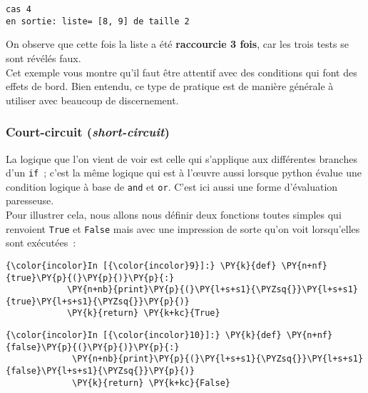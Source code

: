     \begin{Verbatim}[commandchars=\\\{\}]
cas 4
en sortie: liste= [8, 9] de taille 2

    \end{Verbatim}

    On observe que cette fois la liste a été \textbf{raccourcie 3 fois}, car
les trois tests se sont révélés faux.\\

    Cet exemple vous montre qu'il faut être attentif avec des conditions qui
font des effets de bord. Bien entendu, ce type de pratique est de
manière générale à utiliser avec beaucoup de discernement.

    \hypertarget{court-circuit-short-circuit}{%
\subsubsection{\texorpdfstring{Court-circuit
(\emph{short-circuit})}{Court-circuit (short-circuit)}}\label{court-circuit-short-circuit}}

    La logique que l'on vient de voir est celle qui s'applique aux
différentes branches d'un \texttt{if}~; c'est la même logique qui est à
l'œuvre aussi lorsque python évalue une condition logique à base de
\texttt{and} et \texttt{or}. C'est ici aussi une forme d'évaluation
paresseuse.\\

    Pour illustrer cela, nous allons nous définir deux fonctions toutes
simples qui renvoient \texttt{True} et \texttt{False} mais avec une
impression de sorte qu'on voit lorsqu'elles sont exécutées~:

    \begin{Verbatim}[commandchars=\\\{\}]
{\color{incolor}In [{\color{incolor}9}]:} \PY{k}{def} \PY{n+nf}{true}\PY{p}{(}\PY{p}{)}\PY{p}{:}
            \PY{n+nb}{print}\PY{p}{(}\PY{l+s+s1}{\PYZsq{}}\PY{l+s+s1}{true}\PY{l+s+s1}{\PYZsq{}}\PY{p}{)}
            \PY{k}{return} \PY{k+kc}{True}
\end{Verbatim}


    \begin{Verbatim}[commandchars=\\\{\}]
{\color{incolor}In [{\color{incolor}10}]:} \PY{k}{def} \PY{n+nf}{false}\PY{p}{(}\PY{p}{)}\PY{p}{:}
             \PY{n+nb}{print}\PY{p}{(}\PY{l+s+s1}{\PYZsq{}}\PY{l+s+s1}{false}\PY{l+s+s1}{\PYZsq{}}\PY{p}{)}
             \PY{k}{return} \PY{k+kc}{False}
\end{Verbatim}


